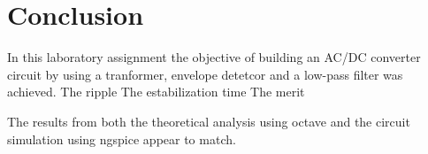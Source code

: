\section{Conclusion}
\label{sec:conclusion}

In this laboratory assignment the objective of building an AC/DC converter circuit by using a tranformer, envelope detetcor and a low-pass filter was achieved.
 The ripple
 The estabilization time 
 The merit
 
The results from both the theoretical analysis using octave and the circuit
simulation using ngspice appear to match.
